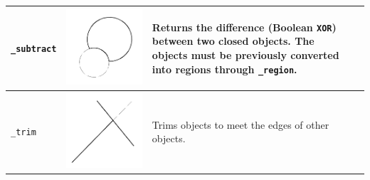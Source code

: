 \documentclass[..]{../IEEEphot}
\begin{document}
\begin{center}
\begin{longtable}{m{.2\linewidth}m{.2\linewidth}m{.25\linewidth}m{.25\linewidth}}
\texttt{\_subtract} & \includegraphics[width = 0.8\linewidth, keepaspectratio]{../images/jpg/_subtract.jpg} & Returns the difference (Boolean \texttt{XOR}) between two closed objects. The objects must be previously converted into regions through \texttt{\_region}. & 
\\
\midrule
\texttt{\_trim} & \includegraphics[width = 0.8\linewidth, keepaspectratio]{../images/jpg/_trim.jpg} & Trims objects to meet the edges of other objects.  & 
\\	
\midrule

\end{longtable}
\end{center}
\end{document}
